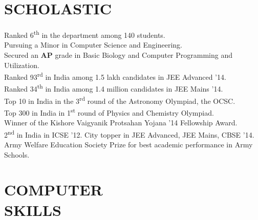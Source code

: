 \documentclass[margin, 10pt]{res} %
\begin{document}



\begin{resume}

 
\section{SCHOLASTIC}  

Ranked 6\textsuperscript{th} in the department among 140 students.\\
Pursuing a Minor in Computer Science and Engineering.\\
Secured an \textbf{AP} grade in Basic Biology and Computer Programming and Utilization.\\
Ranked 93\textsuperscript{rd} in India among 1.5 lakh candidates in JEE Advanced '14.\\
Ranked 34\textsuperscript{th} in India among 1.4 million candidates in JEE Mains '14.\\
Top 10 in India in the 3\textsuperscript{rd} round of the Astronomy Olympiad, the OCSC.\\
Top 300 in India in 1\textsuperscript{st} round of Physics and Chemistry Olympiad.\\
Winner of the Kishore Vaigyanik Protsahan Yojana '14 Fellowship Award.\\
2\textsuperscript{nd} in India in ICSE '12. City topper in JEE Advanced, JEE Mains, CBSE '14.\\
Army Welfare Education Society Prize for best academic performance in Army Schools.

 

\section{COMPUTER \\ SKILLS} 


\end{resume}
\end{document}

